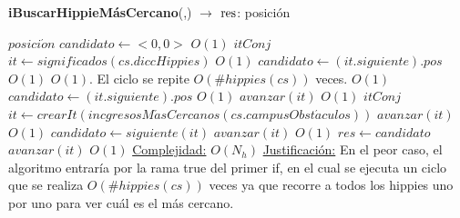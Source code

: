 \begin{Algoritmos}
\begin{algorithm}[H]{\textbf{iBuscarHippieM\'asCercano}(,) $\to$ $\res$: posici\'on}
	\begin{algorithmic}
        \State $posici\acute{o}n$ $candidato \gets <0,0>$
        	\Comment $O(1)$
        	\State $itConj$ $it \gets significados(cs.diccHippies)$ \Comment $O(1)$
            \State $candidato \gets (it.siguiente).pos$ \Comment $O(1)$
             \Comment $O(1)$. El ciclo se repite $O(\#hippies(cs))$ veces.
            		\Comment $O(1)$
                	\State $candidato \gets (it.siguiente).pos$ \Comment $O(1)$
                \EndIf
                \State $avanzar(it)$ \Comment $O(1)$
            \EndWhile
        \Else
        	\State $itConj$ $it \gets crearIt(incgresosM\acute{a}sCercanos(cs.campusObst\acute{a}culos))$ $avanzar(it)$ \Comment $O(1)$
            \State $candidato \gets siguiente(it)$ $avanzar(it)$ \Comment $O(1)$
        \EndIf
        \State $res \gets candidato$ $avanzar(it)$ \Comment $O(1)$
        \medskip
		\Statex \underline{Complejidad:} $O(N_{h})$
		\Statex \underline{Justificaci\'on:} En el peor caso, el algoritmo entrar\'ia por la rama true del primer if, en el cual se ejecuta un ciclo que se realiza $O(\#hippies(cs))$ veces ya que recorre a todos los hippies uno por uno para ver cu\'al es el m\'as cercano.
	\end{algorithmic}
\end{algorithm}

\end{Algoritmos}
